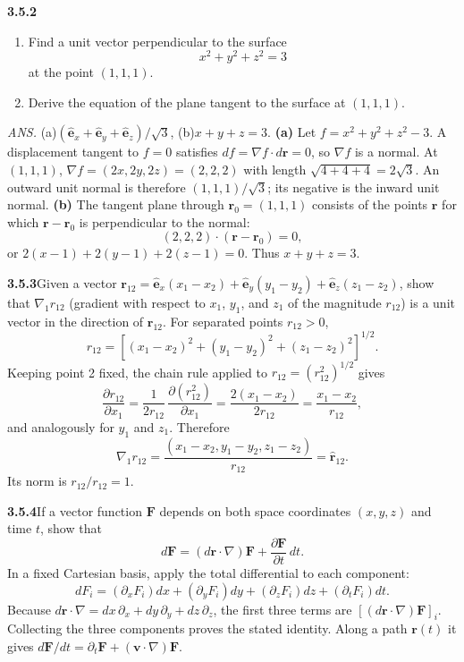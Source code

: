 \par\bigskip
\noindent\textbf{3.5.2}\quad
\begin{enumerate}
\item[(a)] Find a unit vector perpendicular to the surface
  \[
  x^{2}+y^{2}+z^{2}=3
  \]
  at the point $(1,1,1)$.
\item[(b)] Derive the equation of the plane tangent to the surface at
  $(1,1,1)$.
\end{enumerate}
\par\nobreak\hfill\emph{ANS.}\enspace
(a)\enspace$\left(\hat{\mathbf{e}}_{x}+\hat{\mathbf{e}}_{y}
+\hat{\mathbf{e}}_{z}\right)/\sqrt{3}$,\quad
(b)\enspace$x+y+z=3$.
\solution
\textbf{(a)} Let $f=x^2+y^2+z^2-3$. A displacement tangent to $f=0$
satisfies $df=\nabla f\cdot d\mathbf r=0$, so $\nabla f$ is a normal.
At $(1,1,1)$, $\nabla f=(2x,2y,2z)=(2,2,2)$ with length
$\sqrt{4+4+4}=2\sqrt3$.
An outward unit normal is therefore $(1,1,1)/\sqrt3$; its negative
is the inward unit normal.
\textbf{(b)} The tangent plane through $\mathbf r_0=(1,1,1)$ consists of
the points $\mathbf r$ for which $\mathbf r-\mathbf r_0$ is
perpendicular to the normal:
\[
(2,2,2)\cdot(\mathbf r-\mathbf r_0)=0,
\]
or $2(x-1)+2(y-1)+2(z-1)=0$. Thus
$\boxed{x+y+z=3}$.

\par\bigskip
\noindent\textbf{3.5.3}\quad Given a vector
$\mathbf{r}_{12}=\hat{\mathbf{e}}_{x}(x_{1}-x_{2})
+\hat{\mathbf{e}}_{y}(y_{1}-y_{2})+\hat{\mathbf{e}}_{z}(z_{1}-z_{2})$, show
that $\nabla_{1}r_{12}$ (gradient with respect to $x_{1}$, $y_{1}$, and
$z_{1}$ of the magnitude $r_{12}$) is a unit vector in the direction of
$\mathbf{r}_{12}$.
\solution
For separated points $r_{12}>0$,
\[
r_{12}=[(x_1-x_2)^2+(y_1-y_2)^2+(z_1-z_2)^2]^{1/2}.
\]
Keeping point 2 fixed, the chain rule applied to
$r_{12}=(r_{12}^2)^{1/2}$ gives
\[
\frac{\partial r_{12}}{\partial x_1}
=\frac1{2r_{12}}\,\frac{\partial(r_{12}^2)}{\partial x_1}
=\frac{2(x_1-x_2)}{2r_{12}}=\frac{x_1-x_2}{r_{12}},
\]
and analogously for $y_1$ and $z_1$. Therefore
\[
\boxed{\nabla_1r_{12}=\frac{(x_1-x_2,y_1-y_2,z_1-z_2)}{r_{12}}
=\hat{\mathbf r}_{12}}.
\]
Its norm is $r_{12}/r_{12}=1$.

\par\bigskip
\noindent\textbf{3.5.4}\quad If a vector function $\mathbf{F}$ depends on both
space coordinates $(x,y,z)$ and time $t$, show that
\[
d\mathbf{F}=(d\mathbf{r}\cdot\nabla)\mathbf{F}
+\frac{\partial\mathbf{F}}{\partial t}\,dt.
\]
\solution
In a fixed Cartesian basis, apply the total differential to each component:
\[
dF_i=(\partial_xF_i)dx+(\partial_yF_i)dy+(\partial_zF_i)dz
+(\partial_tF_i)dt.
\]
Because $d\mathbf r\cdot\nabla=dx\,\partial_x+dy\,\partial_y+dz\,\partial_z$,
the first three terms are $[(d\mathbf r\cdot\nabla)\mathbf F]_i$.
Collecting the three components proves the stated identity.
Along a path $\mathbf r(t)$ it gives
$d\mathbf F/dt=\partial_t\mathbf F+(\mathbf v\cdot\nabla)\mathbf F$.

